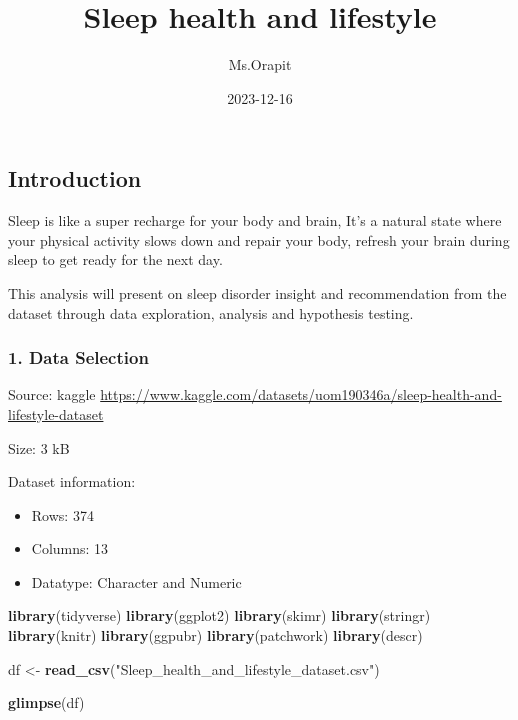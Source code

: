\documentclass[
]{article}
\title{Sleep health and lifestyle}
\author{Ms.Orapit}
\date{2023-12-16}
\newenvironment{Shaded}{\begin{snugshade}}{\end{snugshade}}
\newcommand{\FunctionTok}[1]{\textcolor[rgb]{0.13,0.29,0.53}{\textbf{#1}}}
\newcommand{\NormalTok}[1]{#1}
\newcommand{\OtherTok}[1]{\textcolor[rgb]{0.56,0.35,0.01}{#1}}
\newcommand{\StringTok}[1]{\textcolor[rgb]{0.31,0.60,0.02}{#1}}
\providecommand{\tightlist}{%
  \setlength{\itemsep}{0pt}\setlength{\parskip}{0pt}}
\begin{document}
\maketitle

\hypertarget{introduction}{%
\subsection{\texorpdfstring{\textbf{Introduction}}{Introduction}}\label{introduction}}

Sleep is like a super recharge for your body and brain, It's a natural
state where your physical activity slows down and repair your body,
refresh your brain during sleep to get ready for the next day.

This analysis will present on sleep disorder insight and recommendation
from the dataset through data exploration, analysis and hypothesis
testing.

\hypertarget{data-selection}{%
\subsubsection{\texorpdfstring{\textbf{1. Data
Selection}}{1. Data Selection}}\label{data-selection}}

Source: kaggle
\url{https://www.kaggle.com/datasets/uom190346a/sleep-health-and-lifestyle-dataset}

Size: 3 kB

Dataset information:

\begin{itemize}
\tightlist
\item
  Rows: 374
\item
  Columns: 13
\item
  Datatype: Character and Numeric
\end{itemize}

\begin{Shaded}
\begin{Highlighting}[]
\FunctionTok{library}\NormalTok{(tidyverse)}
\FunctionTok{library}\NormalTok{(ggplot2)}
\FunctionTok{library}\NormalTok{(skimr)}
\FunctionTok{library}\NormalTok{(stringr)}
\FunctionTok{library}\NormalTok{(knitr)}
\FunctionTok{library}\NormalTok{(ggpubr)}
\FunctionTok{library}\NormalTok{(patchwork)}
\FunctionTok{library}\NormalTok{(descr)}

\NormalTok{df }\OtherTok{\textless{}{-}} \FunctionTok{read\_csv}\NormalTok{(}\StringTok{"Sleep\_health\_and\_lifestyle\_dataset.csv"}\NormalTok{)}

\FunctionTok{glimpse}\NormalTok{(df)}
\end{Highlighting}
\end{Shaded}
\end{document}
